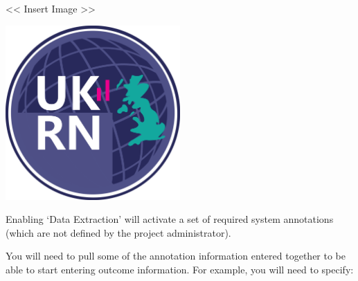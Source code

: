 \documentclass[]{book}
\begin{document}
\textless{}\textless{} Insert Image \textgreater{}\textgreater{}

\includegraphics[width=0.50000\textwidth,height=0.50000\textwidth]{figs/evidence-triangle.png}

Enabling `Data Extraction' will activate a set of required system
annotations (which are not defined by the project administrator).

You will need to pull some of the annotation information entered
together to be able to start entering outcome information. For example,
you will need to specify:
\end{document}

